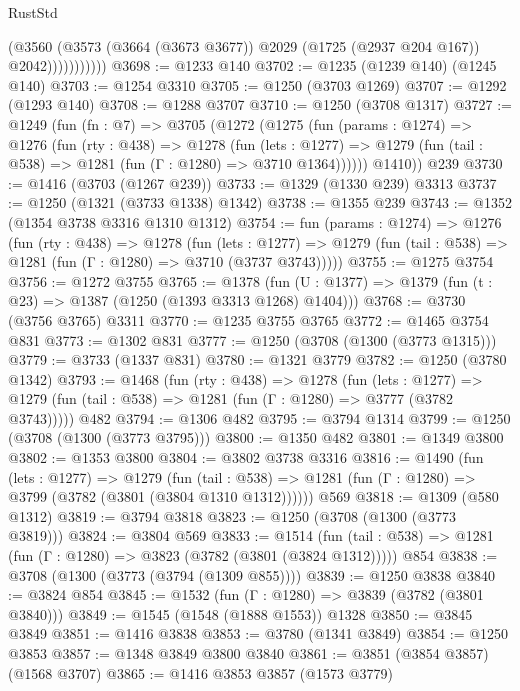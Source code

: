 \begin{lexlean}{RustStd}
\begin{coremodule}
                      (@3560
                        (@3573
                          (@3664 (@3673 @3677))
                          @2029
                          (@1725 (@2937 @204 @167))
                          @2042)))))))))))
@3698 := @1233 @140
@3702 := @1235 (@1239 @140) (@1245 @140)
@3703 := @1254 @3310
@3705 := @1250 (@3703 @1269)
@3707 := @1292 (@1293 @140)
@3708 := @1288 @3707
@3710 := @1250 (@3708 @1317)
@3727 := @1249
    (fun (fn : @7) =>
    @3705
      (@1272
        (@1275
          (fun (params : @1274) =>
          @1276
            (fun (rty : @438) =>
            @1278
              (fun (lets : @1277) =>
              @1279 (fun (tail : @538) => @1281 (fun (Γ : @1280) => @3710 @1364))))))
        @1410))
    @239
@3730 := @1416 (@3703 (@1267 @239))
@3733 := @1329 (@1330 @239) @3313
@3737 := @1250 (@1321 (@3733 @1338) @1342)
@3738 := @1355 @239
@3743 := @1352 (@1354 @3738 @3316 @1310 @1312)
@3754 := fun (params : @1274) =>
  @1276
    (fun (rty : @438) =>
    @1278
      (fun (lets : @1277) =>
      @1279 (fun (tail : @538) => @1281 (fun (Γ : @1280) => @3710 (@3737 @3743)))))
@3755 := @1275 @3754
@3756 := @1272 @3755
@3765 := @1378 (fun (U : @1377) => @1379 (fun (t : @23) => @1387 (@1250 (@1393 @3313 @1268) @1404)))
@3768 := @3730 (@3756 @3765) @3311
@3770 := @1235 @3755 @3765
@3772 := @1465 @3754 @831
@3773 := @1302 @831
@3777 := @1250 (@3708 (@1300 (@3773 @1315)))
@3779 := @3733 (@1337 @831)
@3780 := @1321 @3779
@3782 := @1250 (@3780 @1342)
@3793 := @1468
    (fun (rty : @438) =>
    @1278
      (fun (lets : @1277) =>
      @1279 (fun (tail : @538) => @1281 (fun (Γ : @1280) => @3777 (@3782 @3743)))))
    @482
@3794 := @1306 @482
@3795 := @3794 @1314
@3799 := @1250 (@3708 (@1300 (@3773 @3795)))
@3800 := @1350 @482
@3801 := @1349 @3800
@3802 := @1353 @3800
@3804 := @3802 @3738 @3316
@3816 := @1490
    (fun (lets : @1277) =>
    @1279
      (fun (tail : @538) => @1281 (fun (Γ : @1280) => @3799 (@3782 (@3801 (@3804 @1310 @1312))))))
    @569
@3818 := @1309 (@580 @1312)
@3819 := @3794 @3818
@3823 := @1250 (@3708 (@1300 (@3773 @3819)))
@3824 := @3804 @569
@3833 := @1514
    (fun (tail : @538) => @1281 (fun (Γ : @1280) => @3823 (@3782 (@3801 (@3824 @1312)))))
    @854
@3838 := @3708 (@1300 (@3773 (@3794 (@1309 @855))))
@3839 := @1250 @3838
@3840 := @3824 @854
@3845 := @1532 (fun (Γ : @1280) => @3839 (@3782 (@3801 @3840)))
@3849 := @1545 (@1548 (@1888 @1553)) @1328
@3850 := @3845 @3849
@3851 := @1416 @3838
@3853 := @3780 (@1341 @3849)
@3854 := @1250 @3853
@3857 := @1348 @3849 @3800 @3840
@3861 := @3851 (@3854 @3857) (@1568 @3707)
@3865 := @1416 @3853 @3857 (@1573 @3779)

\end{coremodule}
\end{lexlean}
